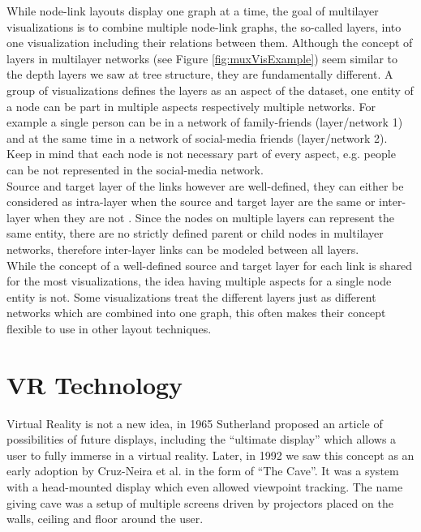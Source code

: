 While node-link layouts display one graph at a time, the goal of multilayer visualizations \label{exp:multilayer} is to combine multiple node-link graphs, the so-called layers, into one visualization including their relations between them. Although the concept of layers in multilayer networks (see Figure \ref{fig:muxVisExample}) seem similar to the depth layers we saw at tree structure, they are fundamentally different. A group of visualizations defines the layers as an aspect of the dataset, one entity of a node can be part in multiple aspects respectively multiple networks. For example a single person can be in a network of family-friends (layer/network 1) and at the same time in a network of social-media friends (layer/network 2). Keep in mind that each node is not necessary part of every aspect, e.g. people can be not represented in the social-media network.\\
Source and target layer of the links however are well-defined, they can either be considered as intra-layer when the source and target layer are the same or inter-layer when they are not \cite{ghoniem_state_2019}. Since the nodes on multiple layers can represent the same entity, there are no strictly defined parent or child nodes in multilayer networks, therefore inter-layer links can be modeled between all layers.\\
While the concept of a well-defined source and target layer for each link is shared for the most visualizations, the idea having multiple aspects for a single node entity is not. Some visualizations treat the different layers just as different networks which are combined into one graph, this often makes their concept flexible to use in other layout techniques. 

\section{VR Technology}
\label{chap:bg-vrtech}
Virtual Reality is not a new idea, in 1965 Sutherland \cite{Sutherland65theultimate} proposed an article of possibilities of future displays, including the “ultimate display” which allows a user to fully immerse in a virtual reality. Later, in 1992 we saw this concept as an early adoption by Cruz-Neira et al. \cite{cruz-neira_cave_1992} in the form of “The Cave”. It was a system with a head-mounted display which even allowed viewpoint tracking. The name giving cave was a setup of multiple screens driven by projectors placed on the walls, ceiling and floor around the user.

